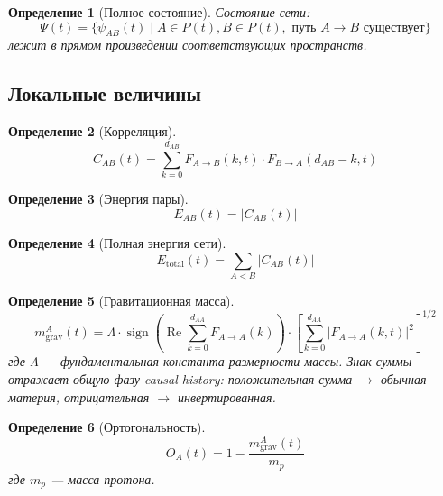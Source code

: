 \documentclass[11pt,a4paper]{article}
\newtheorem{definition}{Определение}[section]
\theoremstyle{definition}
\begin{document}
\begin{definition}[Полное состояние]
Состояние сети:
\begin{equation}
    \Psi(t) = \{\psi_{AB}(t) \mid A \in P(t), B \in P(t), \text{ путь } A \to B \text{ существует}\}
\end{equation}
лежит в прямом произведении соответствующих пространств.
\end{definition}

\subsection{Локальные величины}

\begin{definition}[Корреляция]
\begin{equation}
    C_{AB}(t) = \sum_{k=0}^{d_{AB}} F_{A \to B}(k, t) \cdot F_{B \to A}(d_{AB} - k, t)
\end{equation}
\end{definition}

\begin{definition}[Энергия пары]
\begin{equation}
    E_{AB}(t) = |C_{AB}(t)|
\end{equation}
\end{definition}

\begin{definition}[Полная энергия сети]
\begin{equation}
    E_{\text{total}}(t) = \sum_{A < B} |C_{AB}(t)|
\end{equation}
\end{definition}

\begin{definition}[Гравитационная масса]
\begin{equation}
    m_{\text{grav}}^A(t) = \Lambda \cdot \operatorname{sign}\!\left(\operatorname{Re} \sum_{k=0}^{d_{AA}} F_{A \to A}(k)\right) \cdot \left[ \sum_{k=0}^{d_{AA}} |F_{A \to A}(k, t)|^2 \right]^{1/2}
\end{equation}
где $\Lambda$ --- фундаментальная константа размерности массы. Знак суммы отражает общую фазу causal history: положительная сумма $\to$ обычная материя, отрицательная $\to$ инвертированная.
\end{definition}

\begin{definition}[Ортогональность]
\begin{equation}
    O_A(t) = 1 - \frac{m_{\text{grav}}^A(t)}{m_p}
\end{equation}
где $m_p$ --- масса протона.
\end{definition}
\end{document}
